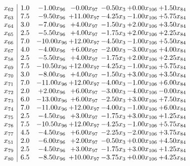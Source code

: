 \documentclass[8pt]{article}
\begin{document}
\[\begin{array}{c| c c@{\hskip 2pt} c@{\hskip 2pt} c@{\hskip 2pt} c@{\hskip 2pt} c@{\hskip 2pt} }
 x_{62}   &  1.0 & -1.00 x_{96} & -0.00 x_{97} & -0.50 x_{3} & +  0.00 x_{106} & +  1.50 x_{84}\\
 x_{63}   &  7.5 & -9.50 x_{96} & + 11.00 x_{97} & -4.25 x_{3} & -1.00 x_{106} & +  5.75 x_{84}\\
 x_{64}   &  3.0 & -7.00 x_{96} & +  4.00 x_{97} & -1.50 x_{3} & +  2.00 x_{106} & +  3.50 x_{84}\\
 x_{65}   &  2.5 & -5.50 x_{96} & +  4.00 x_{97} & -1.75 x_{3} & +  2.00 x_{106} & +  2.25 x_{84}\\
 x_{66}   &  7.0 & -10.00 x_{96} & + 12.00 x_{97} & -4.50 x_{3} & -1.00 x_{106} & +  5.50 x_{84}\\
 x_{67}   &  4.0 & -4.00 x_{96} & +  6.00 x_{97} & -2.00 x_{3} & -3.00 x_{106} & +  4.00 x_{84}\\
 x_{58}   &  2.5 & -5.50 x_{96} & +  4.00 x_{97} & -1.75 x_{3} & +  2.00 x_{106} & +  2.25 x_{84}\\
 x_{69}   &  7.5 & -10.50 x_{96} & + 12.00 x_{97} & -4.25 x_{3} & -1.00 x_{106} & +  5.75 x_{84}\\
 x_{70}   &  3.0 & -8.00 x_{96} & +  4.00 x_{97} & -1.50 x_{3} & +  3.00 x_{106} & +  3.50 x_{84}\\
 x_{71}   &  7.0 & -11.00 x_{96} & + 12.00 x_{97} & -4.00 x_{3} & -1.00 x_{106} & +  6.00 x_{84}\\
 x_{72}   &  2.0 & +  2.00 x_{96} & +  6.00 x_{97} & -3.00 x_{3} & -4.00 x_{106} & -0.00 x_{84}\\
 x_{73}   &  6.0 & -13.00 x_{96} & +  6.00 x_{97} & -2.50 x_{3} & +  3.00 x_{106} & +  7.50 x_{84}\\
 x_{74}   &  7.0 & -11.00 x_{96} & + 12.00 x_{97} & -4.00 x_{3} & -1.00 x_{106} & +  6.00 x_{84}\\
 x_{75}   &  2.5 & -4.50 x_{96} & +  3.00 x_{97} & -1.75 x_{3} & +  3.00 x_{106} & +  1.25 x_{84}\\
 x_{76}   &  7.5 & -10.50 x_{96} & + 12.00 x_{97} & -4.25 x_{3} & -1.00 x_{106} & +  5.75 x_{84}\\
 x_{77}   &  4.5 & -4.50 x_{96} & +  6.00 x_{97} & -2.25 x_{3} & -2.00 x_{106} & +  3.75 x_{84}\\
 x_{51}   &  2.0 & -6.00 x_{96} & +  2.00 x_{97} & -0.50 x_{3} & +  0.00 x_{106} & +  4.50 x_{84}\\
 x_{79}   &  2.5 & -4.50 x_{96} & +  3.00 x_{97} & -1.75 x_{3} & +  3.00 x_{106} & +  1.25 x_{84}\\
 x_{80}   &  6.5 & -8.50 x_{96} & + 10.00 x_{97} & -3.75 x_{3} & +  0.00 x_{106} & +  4.25 x_{84}\\

\end{array}\]
\end{document}
